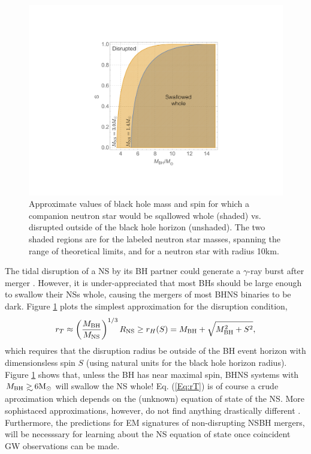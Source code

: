 \begin{figure}
\begin{center}
\includegraphics[scale=0.33]{figures/ch0/BHNS_TDs} 
\end{center}
\caption{Approximate values of black hole mass and spin for which a companion neutron star would be sqallowed whole (shaded) vs. disrupted outside of the black hole horizon (unshaded). The two shaded regions are for the labeled neutron star masses, spanning the range of theoretical limits, and for a neutron star with radius 10km.}
\label{Fig:NSBH_TDs}
\end{figure}

The tidal disruption of a NS by its BH partner could generate a $\gamma$-ray
burst after merger \citep{NPP:NSBH_GRB:1992}. However, it is under-appreciated
that most BHs should be large enough to swallow their NSs
whole, causing the mergers of most BHNS binaries to be dark. Figure 
\ref{Fig:NSBH_TDs} plots the simplest approximation for the disruption condition,
\begin{equation}
 r_T \approx \left( \frac{M_{\rm{BH}} }{ M_{\rm{NS}}} \right)^{1/3} R_{\rm{NS}} \geq r_H(S) 
 = M_{\rm{BH}} + \sqrt{M^2_{\rm{BH}} + S^2},
 \label{Eq:rT}
\end{equation}
which requires that the disruption radius be outside of the BH event horizon
with dimensionsless spin $S$ (using natural units for the black hole horizon
radius). Figure \ref{Fig:NSBH_TDs} shows that, unless the BH has near maximal
spin, BHNS systems with $M_{\rm{BH}} \gsim 6 \msun$ will swallow the NS whole!
Eq. (\ref{Eq:rT}) is of course a crude aproximation which depends on the
(unknown) equation of state of the NS. More sophistaced approximations,
however, do not find anything drastically different
\citep[\emph{e.g.}][]{Foucart:2012}. Furthermore, the predictions for EM
signatures of non-disrupting NSBH mergers, will be necesssary for learning
about the NS equation of state once coincident GW observations can be made.


